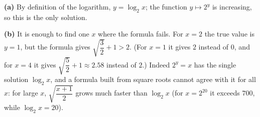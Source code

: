 \textbf{(a)} By definition of the logarithm, $y=\boxed{\log_2x}$; the function $y\mapsto2^y$ is increasing, so this is the only solution.

\textbf{(b)} It is enough to find one $x$ where the formula fails. For $x=2$ the true value is $y=1$, but the formula gives $\sqrt{\dfrac32}+1>2$. (For $x=1$ it gives $2$ instead of $0$, and for $x=4$ it gives $\sqrt{\dfrac52}+1\approx2.58$ instead of $2$.) Indeed $2^y=x$ has the single solution $\log_2x$, and a formula built from square roots cannot agree with it for all $x$: for large $x$, $\sqrt{\dfrac{x+1}{2}}$ grows much faster than $\log_2x$ (for $x=2^{20}$ it exceeds $700$, while $\log_2x=20$).
